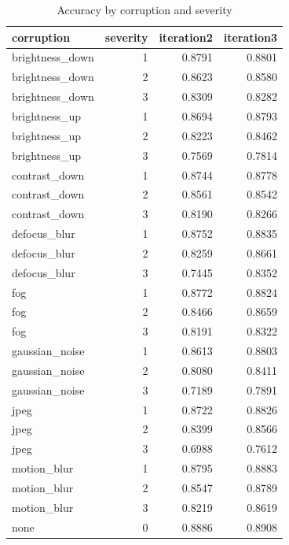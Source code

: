\begin{table}
\caption{Accuracy by corruption and severity}
\begin{tabular}{lrrr}
\toprule
corruption & severity & iteration2 & iteration3 \\
\midrule
brightness\_down & 1 & 0.8791 & 0.8801 \\
brightness\_down & 2 & 0.8623 & 0.8580 \\
brightness\_down & 3 & 0.8309 & 0.8282 \\
brightness\_up & 1 & 0.8694 & 0.8793 \\
brightness\_up & 2 & 0.8223 & 0.8462 \\
brightness\_up & 3 & 0.7569 & 0.7814 \\
contrast\_down & 1 & 0.8744 & 0.8778 \\
contrast\_down & 2 & 0.8561 & 0.8542 \\
contrast\_down & 3 & 0.8190 & 0.8266 \\
defocus\_blur & 1 & 0.8752 & 0.8835 \\
defocus\_blur & 2 & 0.8259 & 0.8661 \\
defocus\_blur & 3 & 0.7445 & 0.8352 \\
fog & 1 & 0.8772 & 0.8824 \\
fog & 2 & 0.8466 & 0.8659 \\
fog & 3 & 0.8191 & 0.8322 \\
gaussian\_noise & 1 & 0.8613 & 0.8803 \\
gaussian\_noise & 2 & 0.8080 & 0.8411 \\
gaussian\_noise & 3 & 0.7189 & 0.7891 \\
jpeg & 1 & 0.8722 & 0.8826 \\
jpeg & 2 & 0.8399 & 0.8566 \\
jpeg & 3 & 0.6988 & 0.7612 \\
motion\_blur & 1 & 0.8795 & 0.8883 \\
motion\_blur & 2 & 0.8547 & 0.8789 \\
motion\_blur & 3 & 0.8219 & 0.8619 \\
none & 0 & 0.8886 & 0.8908 \\
\bottomrule
\end{tabular}
\end{table}

